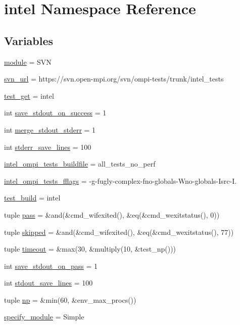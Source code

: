 \hypertarget{namespaceintel}{\section{intel Namespace Reference}
\label{namespaceintel}
}
\subsection*{Variables}
\begin{DoxyCompactItemize}
\item 
\hyperlink{namespaceintel_a69d4dd86ec6bbe47c3b61b1f6ff2ee90}{module} = S\-V\-N
\item 
\hyperlink{namespaceintel_a8d07e9dc296f8c50b9c97df6aaeb9093}{svn\-\_\-url} = https\-://svn.\-open-\/mpi.\-org/svn/ompi-\/tests/trunk/intel\-\_\-tests
\item 
\hyperlink{namespaceintel_a63ac10a6acb63df6cfdeeb2bfebcdf53}{test\-\_\-get} = intel
\item 
int \hyperlink{namespaceintel_aae23293ca49af13cfb800e28cb67a86b}{save\-\_\-stdout\-\_\-on\-\_\-success} = 1
\item 
int \hyperlink{namespaceintel_abcdeb2ca543c96841368e04128f5f60a}{merge\-\_\-stdout\-\_\-stderr} = 1
\item 
int \hyperlink{namespaceintel_a1d6c46c17a246ddee37c7ee9113b90c4}{stderr\-\_\-save\-\_\-lines} = 100
\item 
\hyperlink{namespaceintel_a6d37e743ba16cdc0edc8c8a459e81ef1}{intel\-\_\-ompi\-\_\-tests\-\_\-buildfile} = all\-\_\-tests\-\_\-no\-\_\-perf
\item 
\hyperlink{namespaceintel_a2519f22774a6f062a8d9c1a0ca33f855}{intel\-\_\-ompi\-\_\-tests\-\_\-fflags} = -\/g-\/fugly-\/complex-\/fno-\/globals-\/Wno-\/globals-\/Isrc-\/I.
\item 
\hyperlink{namespaceintel_ae8bf5f8888540acb407bf95e166dcfc6}{test\-\_\-build} = intel
\item 
tuple \hyperlink{namespaceintel_abe7eb5e3e0f0e655ca871399725225ec}{pass} = \&and(\&cmd\-\_\-wifexited(), \&eq(\&cmd\-\_\-wexitstatus(), 0))
\item 
tuple \hyperlink{namespaceintel_a0a787d49a6dd289fbd58591c9de5fbb5}{skipped} = \&and(\&cmd\-\_\-wifexited(), \&eq(\&cmd\-\_\-wexitstatus(), 77))
\item 
tuple \hyperlink{namespaceintel_aeda6c693f850472a86267c93f7665d47}{timeout} = \&max(30, \&multiply(10, \&test\-\_\-np()))
\item 
int \hyperlink{namespaceintel_a842390e7e793fca2c69572646d19a7c2}{save\-\_\-stdout\-\_\-on\-\_\-pass} = 1
\item 
int \hyperlink{namespaceintel_a81a6cddb285ad15b56a91a58c0032984}{stdout\-\_\-save\-\_\-lines} = 100
\item 
tuple \hyperlink{namespaceintel_a558dbc0148f5b13814f44a2d26dd4dd3}{np} = \&min(60, \&env\-\_\-max\-\_\-procs())
\item 
\hyperlink{namespaceintel_a013bf13af420a4b19b5adc9846a18346}{specify\-\_\-module} = Simple
\end{DoxyCompactItemize}


